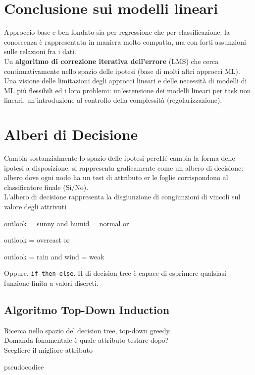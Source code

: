 \documentclass[10pt]{book}
\begin{document}
\section{Conclusione sui modelli lineari}
Approccio base e ben fondato sia per regressione che per classificazione: la conoscenza è rappresentata in maniera molto compatta, ma con forti assunzioni sulle relazioni fra i dati.\\
Un \textbf{algoritmo di correzione iterativa dell'errore} (LMS) che cerca continuativamente nello spazio delle ipotesi (base di molti altri approcci ML).\\
Una visione delle limitazioni degli approcci lineari e delle necessità di modelli di ML più flessibili ed i loro problemi: un'estensione dei modelli lineari per task non lineari, un'introduzione al controllo della complessità (regolarizzazione).
\section{Alberi di Decisione}
Cambia sostanzialmente lo spazio delle ipotesi percHé cambia la forma delle ipotesi a disposizione. si rappresenta graficamente come un albero di decisione: albero dove ogni nodo ha un test di attributo er le foglie corrispondono al classificatore finale (Si/No).\\
L'albero di decisione rappresenta la disgiunzione di congiunzioni di vincoli sul valore degli attrivuti
\begin{list}{}{}
	\item outlook = sunny and humid = normal or
	\item outlook = overcast or
	\item outlook = rain and wind = weak
\end{list}
Oppure, \texttt{if-then-else}. H di decision tree è capace di esprimere qualsiasi funzione finita a valori discreti.
\subsection{Algoritmo Top-Down Induction}
Ricerca nello spazio del decision tree, top-down greedy.\\
Domanda fonamentale è quale attributo testare dopo?\\ %
Scegliere il migliore attributo
\begin{center}
pseudocodice
\end{center}
\end{document}
